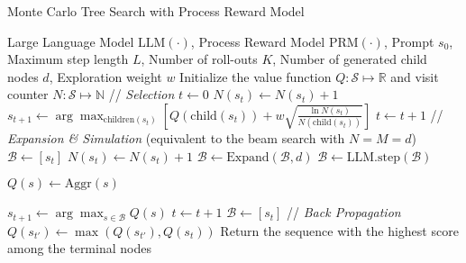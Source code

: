 \begin{algorithm}[ht]
\caption{Monte Carlo Tree Search with Process Reward Model}
\label{alg:mcts}
\begin{algorithmic}[1]
    \REQUIRE Large Language Model $\text{LLM}(\cdot)$, Process Reward Model $\text{PRM}(\cdot)$, Prompt $s_0$, Maximum step length $L$, Number of roll-outs $K$, Number of generated child nodes $d$, Exploration weight $w$
    \STATE Initialize the value function $Q : \mathcal S \mapsto \mathbb R$ and
    visit counter $N : \mathcal S \mapsto \mathbb N$ 
        \STATE // \textit{Selection}
        \STATE $t \gets 0$
            \STATE $N(s_t) \gets N(s_t) + 1$ 
            \STATE $s_{t+1} \gets \arg\max_{\text{children}(s_t)} \left[ Q(\text{child}(s_t)) + w \sqrt{\frac{\ln N(s_t)}{N(\text{child}(s_t))}} \right]$
            \STATE $t \gets t + 1$
        \ENDWHILE
        \STATE // \textit{Expansion \& Simulation} (equivalent to the beam search with $N=M=d$)
        \STATE $\mathcal{B} \gets [s_t]$
            \STATE $N(s_t) \gets N(s_t) + 1$
            \STATE $\mathcal{B} \gets \text{Expand}(\mathcal{B}, d)$
            \STATE $\mathcal{B} \gets \text{LLM.step}(\mathcal{B})$
    
            \STATE $Q(s) \gets \text{Aggr}(s)$
        \ENDFOR
        
            \STATE $s_{t+1} \gets \arg\max_{s \in \mathcal{B}} Q(s)$ 
            \STATE $t \gets t + 1$ 
            \STATE $\mathcal{B} \gets [s_t]$
        \ENDWHILE
        \STATE // \textit{Back Propagation}
            \STATE $Q(s_{t'}) \gets \max (Q(s_{t'}), Q(s_{t}))$
        \ENDFOR
    \ENDFOR
    \STATE Return the sequence with the highest score among the terminal nodes
\end{algorithmic}
\end{algorithm}



